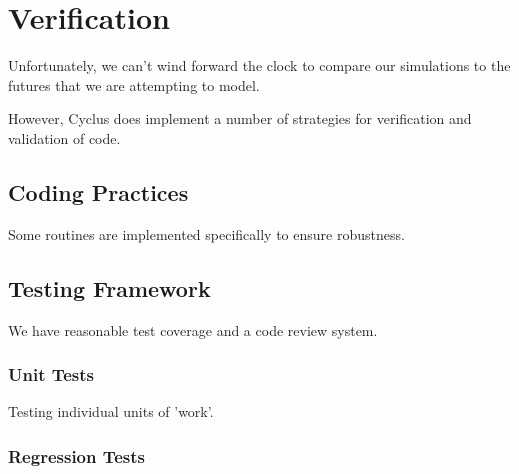 \section{Verification}
%

%


Unfortunately, we can't wind forward the clock to compare our simulations to 
the futures that we are attempting to model.

However, Cyclus does implement a number of strategies for verification and 
validation of code.

\subsection{Coding Practices}

Some routines are implemented specifically to ensure robustness.

\subsection{Testing Framework}

We have reasonable test coverage and a code review system.

\subsubsection{Unit Tests}

Testing individual units of 'work'.

\subsubsection{Regression Tests}

